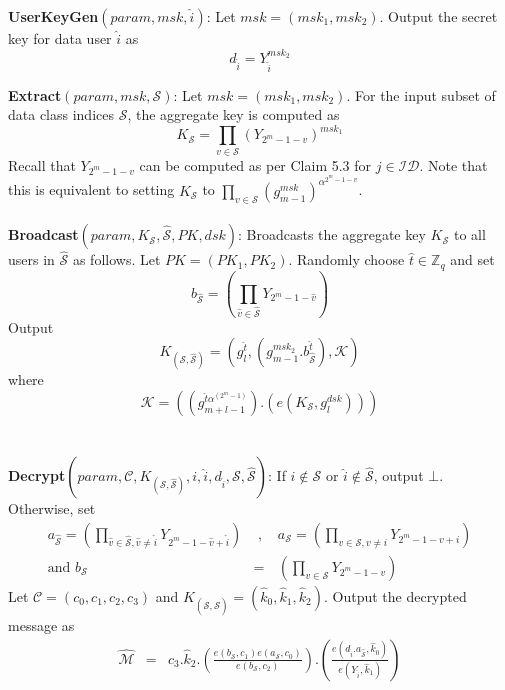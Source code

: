 \noindent\textbf{UserKeyGen}$(param,msk,\hat{i})$: Let $msk=(msk_1,msk_2)$. Output the secret key for data user $\hat{i}$ as
\begin{equation}
 d_{\hat{i}}=Y^{msk_2}_{\hat{i}}\nonumber 
\end{equation}


\noindent \textbf{Extract}$(param,msk,\mathcal{S})$: Let $msk=(msk_1,msk_2)$. For the input subset of data class indices $\mathcal{S}$, the aggregate key is computed as 
\begin{equation}
 K_{\mathcal{S}} = \prod_{v\in\mathcal{S}}\left({Y_{2^m-1-v}}\right)^{msk_1}\nonumber
\end{equation} 
\noindent Recall that $Y_{2^m-1-v}$ can be computed as per Claim 5.3 for $j\in\mathcal{ID}$. Note that this is equivalent to setting $K_{\mathcal{S}}$ to $\prod_{v\in\mathcal{S}}{\left(g^{msk}_{m-1}\right)}^{\alpha^{2^m-1-v}}$.\\\\

\noindent\textbf{Broadcast}$(param,K_{\mathcal{S}},\hat{\mathcal{S}},PK,dsk)$: Broadcasts the aggregate key $K_{\mathcal{S}}$ to all users in $\hat{\mathcal{S}}$ as follows. Let $PK=(PK_1,PK_2)$. Randomly choose $\hat{t}\in\mathbb{Z}_q$ and set
\begin{equation}
b_{\hat{\mathcal{S}}}=\left(\prod_{\hat{v}\in\hat{\mathcal{S}}}Y_{2^m-1-\hat{v}}\right)\nonumber
\end{equation}
\noindent Output 
\begin{equation}
K_{\left(\mathcal{S},\hat{\mathcal{S}}\right)}=\left(g^{\hat{t}}_{l},\left(g^{msk_2}_{m-1}.b^{\hat{t}}_{\hat{\mathcal{S}}}\right),\mathcal{K}\right)\nonumber
\end{equation}
\noindent where 
\begin{equation}
\mathcal{K} = \left(\left(g^{\hat{t}\alpha^{(2^m-1)}}_{m+l-1}\right).\left(e(K_{\mathcal{S}},g^{dsk}_{l})\right)\right)\nonumber
\end{equation}
\\\\
%  
\noindent\textbf{Decrypt}$(param,\mathcal{C},K_{\left(\mathcal{S},\hat{\mathcal{S}}\right)},i,\hat{i},d_{\hat{i}},\mathcal{S},\hat{\mathcal{S}})$: If $i\notin\mathcal{S}$ or $\hat{i}\notin\hat{\mathcal{S}}$, output $\bot$. Otherwise, set
\begin{eqnarray}
 a_{\hat{\mathcal{S}}}=\left(\prod_{\hat{v}\in\hat{\mathcal{S}},\hat{v}\neq \hat{i}}Y_{2^m-1-\hat{v}+\hat{i}}\right)&\text{ , }&
 a_{\mathcal{S}}=\left(\prod_{v\in\mathcal{S},v\neq i}Y_{2^m-1-v+i}\right)\nonumber\\ 
 \text{and }b_{\mathcal{S}}&=&\left(\prod_{v\in\mathcal{S}}Y_{2^m-1-v}\right)\nonumber
\end{eqnarray}
\noindent Let $\mathcal{C}=(c_0,c_1,c_2,c_3)$ and $K_{\left(\mathcal{S},\hat{\mathcal{S}}\right)}=(\hat{k}_0,\hat{k}_1,\hat{k}_2)$. Output the decrypted message as  
\begin{eqnarray} 
\hat{\mathcal{M}}&=&c_3.\hat{k}_2.\left(\frac{e(b_{\mathcal{S}},c_1){e}(a_{\mathcal{S}},c_0)}{{e}(b_{\mathcal{S}},c_2)}\right).\left(\frac{e(d_{\hat{i}}.a_{\hat{\mathcal{S}}},\hat{k}_0)}{e(Y_{\hat{i}},\hat{k}_1)}\right) \nonumber
\end{eqnarray}

